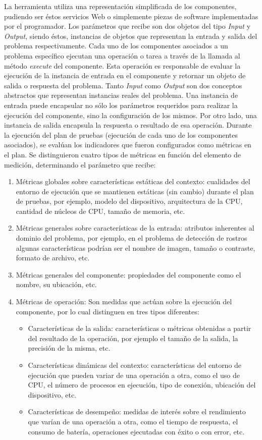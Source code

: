 La herramienta utiliza una representación simplificada de los componentes,
pudiendo ser éstos servicios Web o simplemente piezas de software
implementadas por el programador. Los parámetros que recibe son dos
objetos del tipo \emph{Input} y \emph{Output}, siendo éstos, instancias
de objetos que representan la entrada y salida del problema respectivamente.
Cada uno de los componentes asociados a un problema específico ejecutan
una operación o tarea a través de la llamada al método \emph{execute}
del componente. Esta operación es responsable de evaluar la ejecución
de la instancia de entrada en el componente y retornar un objeto de
salida o respuesta del problema. Tanto \emph{Input} como \emph{Output}
son dos conceptos abstractos que representan instancias reales del
problema. Una instancia de entrada puede encapsular no sólo los parámetros
requeridos para realizar la ejecución del componente, sino la configuración
de los mismos. Por otro lado, una instancia de salida encapsula la
respuesta o resultado de esa operación. Durante la ejecución del plan
de pruebas (ejecución de cada uno de los componentes asociados), se
evalúan los indicadores que fueron configurados como métricas en el
plan. Se distinguieron cuatro tipos de métricas en función del elemento
de medición, determinando el parámetro que recibe: 
\begin{enumerate}
\item Métricas globales sobre características estáticas del contexto: cualidades
del entorno de ejecución que se mantienen estáticas (sin cambio) durante
el plan de pruebas, por ejemplo, modelo del dispositivo, arquitectura
de la CPU, cantidad de núcleos de CPU, tamaño de memoria, etc. 
\item Métricas generales sobre características de la entrada: atributos
inherentes al dominio del problema, por ejemplo, en el problema de
detección de rostros algunas características podrían ser el nombre
de imagen, tamaño o contraste, formato de archivo, etc.
\item Métricas generales del componente: propiedades del componente como
el nombre, su ubicación, etc.
\item Métricas de operación: Son medidas que actúan sobre la ejecución del
componente, por lo cual distinguen en tres tipos diferentes:

\begin{itemize}
\item Características de la salida: características o métricas obtenidas
a partir del resultado de la operación, por ejemplo el tamaño de la
salida, la precisión de la misma, etc.
\item Características dinámicas del contexto: características del entorno
de ejecución que pueden variar de una operación a otra, como el uso
de CPU, el número de procesos en ejecución, tipo de conexión, ubicación
del dispositivo, etc. 
\item Características de desempeño: medidas de interés sobre el rendimiento
que varían de una operación a otra, como el tiempo de respuesta, el
consumo de batería, operaciones ejecutadas con éxito o con error,
etc.
\end{itemize}
\end{enumerate}
